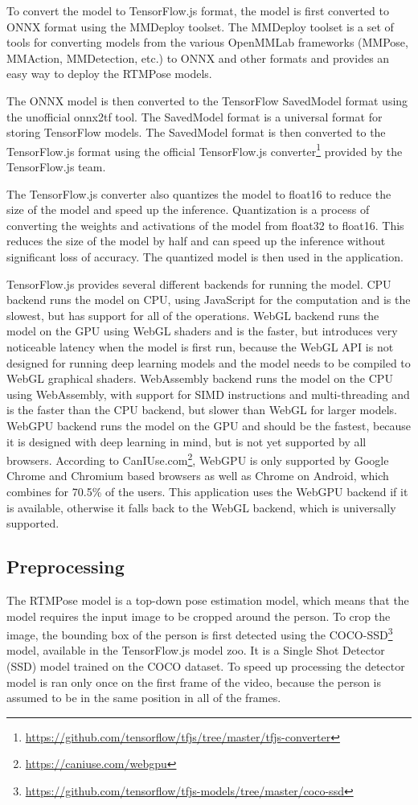 To convert the model to TensorFlow.js format, the model is first converted to ONNX format using the MMDeploy \cite{mmdeploy} toolset. The MMDeploy toolset is a set of tools for converting models from the various OpenMMLab frameworks (MMPose, MMAction, MMDetection, etc.) to ONNX and other formats and provides an easy way to deploy the RTMPose models.

The ONNX model is then converted to the TensorFlow SavedModel format using the unofficial onnx2tf \cite{onnx2tf} tool. The SavedModel format is a universal format for storing TensorFlow models. The SavedModel format is then converted to the TensorFlow.js format using the official TensorFlow.js converter\footnote{\url{https://github.com/tensorflow/tfjs/tree/master/tfjs-converter}} provided by the TensorFlow.js team.

The TensorFlow.js converter also quantizes the model to float16 to reduce the size of the model and speed up the inference. Quantization is a process of converting the weights and activations of the model from float32 to float16. This reduces the size of the model by half and can speed up the inference without significant loss of accuracy. The quantized model is then used in the application.

TensorFlow.js provides several different backends for running the model. CPU backend runs the model on CPU, using JavaScript for the computation and is the slowest, but has support for all of the operations. WebGL backend runs the model on the GPU using WebGL shaders and is the faster, but introduces very noticeable latency when the model is first run, because the WebGL API is not designed for running deep learning models and the model needs to be compiled to WebGL graphical shaders. WebAssembly backend runs the model on the CPU using WebAssembly, with support for SIMD instructions and multi-threading and is the faster than the CPU backend, but slower than WebGL for larger models. WebGPU backend runs the model on the GPU and should be the fastest, because it is designed with deep learning in mind, but is not yet supported by all browsers. According to CanIUse.com\footnote{\url{https://caniuse.com/webgpu}}, WebGPU is only supported by Google Chrome and Chromium based browsers as well as Chrome on Android, which combines for 70.5\% of the users. This application uses the WebGPU backend if it is available, otherwise it falls back to the WebGL backend, which is universally supported.
\subsection{Preprocessing}
The RTMPose model is a top-down pose estimation model, which means that the model requires the input image to be cropped around the person. To crop the image, the bounding box of the person is first detected using the COCO-SSD\footnote{\url{https://github.com/tensorflow/tfjs-models/tree/master/coco-ssd}} model, available in the TensorFlow.js model zoo. It is a Single Shot Detector (SSD) \cite{ssd} model trained on the COCO \cite{coco} dataset. To speed up processing the detector model is ran only once on the first frame of the video, because the person is assumed to be in the same position in all of the frames.

